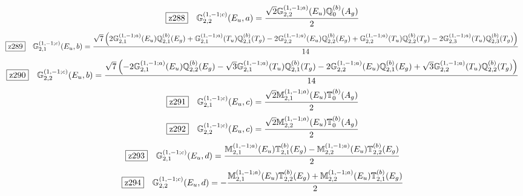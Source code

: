 \documentclass[fleqn,10pt,landscape]{jsarticle}
\begin{document}
\begin{dmath*}
\hspace*{3mm}\fbox{z288}\quad \mathbb{G}_{2,2}^{(1,-1;c)}(E_{u},a)=\frac{\sqrt{2} \mathbb{G}_{2,2}^{(1,-1;a)}(E_{u}) \mathbb{Q}_{0}^{(b)}(A_{g})}{2}
\end{dmath*}
\begin{dmath*}
\hspace*{3mm}\fbox{z289}\quad \mathbb{G}_{2,1}^{(1,-1;c)}(E_{u},b)=\frac{\sqrt{7} \left(2 \mathbb{G}_{2,1}^{(1,-1;a)}(E_{u}) \mathbb{Q}_{2,1}^{(b)}(E_{g}) + \mathbb{G}_{2,1}^{(1,-1;a)}(T_{u}) \mathbb{Q}_{2,1}^{(b)}(T_{g}) - 2 \mathbb{G}_{2,2}^{(1,-1;a)}(E_{u}) \mathbb{Q}_{2,2}^{(b)}(E_{g}) + \mathbb{G}_{2,2}^{(1,-1;a)}(T_{u}) \mathbb{Q}_{2,2}^{(b)}(T_{g}) - 2 \mathbb{G}_{2,3}^{(1,-1;a)}(T_{u}) \mathbb{Q}_{2,3}^{(b)}(T_{g})\right)}{14}
\end{dmath*}
\begin{dmath*}
\hspace*{3mm}\fbox{z290}\quad \mathbb{G}_{2,2}^{(1,-1;c)}(E_{u},b)=\frac{\sqrt{7} \left(- 2 \mathbb{G}_{2,1}^{(1,-1;a)}(E_{u}) \mathbb{Q}_{2,2}^{(b)}(E_{g}) - \sqrt{3} \mathbb{G}_{2,1}^{(1,-1;a)}(T_{u}) \mathbb{Q}_{2,1}^{(b)}(T_{g}) - 2 \mathbb{G}_{2,2}^{(1,-1;a)}(E_{u}) \mathbb{Q}_{2,1}^{(b)}(E_{g}) + \sqrt{3} \mathbb{G}_{2,2}^{(1,-1;a)}(T_{u}) \mathbb{Q}_{2,2}^{(b)}(T_{g})\right)}{14}
\end{dmath*}
\begin{dmath*}
\hspace*{3mm}\fbox{z291}\quad \mathbb{G}_{2,1}^{(1,-1;c)}(E_{u},c)=\frac{\sqrt{2} \mathbb{M}_{2,1}^{(1,-1;a)}(E_{u}) \mathbb{T}_{0}^{(b)}(A_{g})}{2}
\end{dmath*}
\begin{dmath*}
\hspace*{3mm}\fbox{z292}\quad \mathbb{G}_{2,2}^{(1,-1;c)}(E_{u},c)=\frac{\sqrt{2} \mathbb{M}_{2,2}^{(1,-1;a)}(E_{u}) \mathbb{T}_{0}^{(b)}(A_{g})}{2}
\end{dmath*}
\begin{dmath*}
\hspace*{3mm}\fbox{z293}\quad \mathbb{G}_{2,1}^{(1,-1;c)}(E_{u},d)=\frac{\mathbb{M}_{2,1}^{(1,-1;a)}(E_{u}) \mathbb{T}_{2,1}^{(b)}(E_{g}) - \mathbb{M}_{2,2}^{(1,-1;a)}(E_{u}) \mathbb{T}_{2,2}^{(b)}(E_{g})}{2}
\end{dmath*}
\begin{dmath*}
\hspace*{3mm}\fbox{z294}\quad \mathbb{G}_{2,2}^{(1,-1;c)}(E_{u},d)=- \frac{\mathbb{M}_{2,1}^{(1,-1;a)}(E_{u}) \mathbb{T}_{2,2}^{(b)}(E_{g}) + \mathbb{M}_{2,2}^{(1,-1;a)}(E_{u}) \mathbb{T}_{2,1}^{(b)}(E_{g})}{2}
\end{dmath*}
\end{document}
